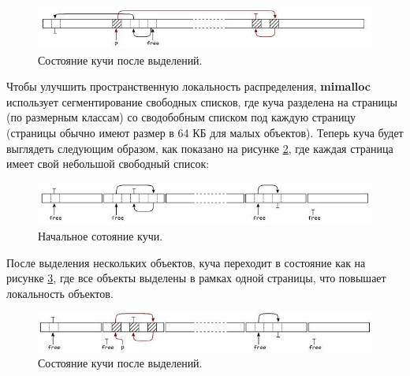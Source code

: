 \begin{figure}[!h]
	\begin{center}
		\includegraphics[scale=0.8]{images/mimalloc-free-list-state-b.jpg}
		\caption{Состояние кучи после выделений.}
		\label{mimalloc-free-list-state-b}
	\end{center}
\end{figure}

Чтобы улучшить пространственную локальность распределения, \textbf{mimalloc} использует сегментирование свободных списков, где куча разделена на страницы (по размерным классам) со сводобобным списком под каждую страницу (страницы обычно имеют размер в 64 КБ для малых объектов). Теперь куча будет выглядеть следующим образом, как показано на рисунке \ref{mimalloc-free-list-state-aa}, где каждая страница имеет свой небольшой свободный список:

\begin{figure}[!h]
	\begin{center}
		\includegraphics[scale=0.8]{images/mimalloc-free-list-state-aa.jpg}
		\caption{Начальное сотояние кучи.}
		\label{mimalloc-free-list-state-aa}
	\end{center}
\end{figure}

После выделения нескольких объектов, куча переходит в состояние как на рисунке \ref{mimalloc-free-list-state-bb}, где все объекты выделены в рамках одной страницы, что повышает локальность объектов.

\begin{figure}[!h]
	\begin{center}
		\includegraphics[scale=0.8]{images/mimalloc-free-list-state-bb.jpg}
		\caption{Состояние кучи после выделений.}
		\label{mimalloc-free-list-state-bb}
	\end{center}
\end{figure}


